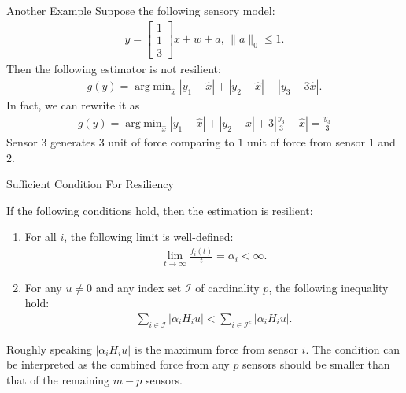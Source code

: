 \documentclass[10pt]{beamer}
\DeclareMathOperator{\argmin}{arg\;min}
\begin{document}
\begin{frame}{Another Example}
  Suppose the following sensory model:
  \begin{align*}
    y = \begin{bmatrix}
      1\\
      1\\
      3
    \end{bmatrix}x + w+a ,\,\|a\|_0\leq 1.
  \end{align*}
  Then the following estimator is not resilient:
  \begin{align*}
    g(y) = \argmin_{\hat x}  |y_1-\hat x|+|y_2-\hat x|+|y_3-3\hat x|.
  \end{align*}
  In fact, we can rewrite it as
  \begin{align*}
    g(y) = \argmin_{\hat x}  |y_1-\hat x|+|y_2-\hat x|+3\left|\frac{y_3}{3}-\hat x\right| = \frac{y_3}{3}
  \end{align*}
  Sensor $3$ generates $3$ unit of force comparing to $1$ unit of force from sensor $1$ and $2$.
\end{frame}

\begin{frame}{Sufficient Condition For Resiliency}
  \begin{theorem}
    If the following conditions hold, then the estimation is resilient:
    \begin{enumerate}
    \item For all $i$, the following limit is well-defined:
      \begin{align*}
        \lim_{t\rightarrow\infty}\frac{f_i(t)}{t} = \alpha_i < \infty.
      \end{align*}
    \item For any $u\neq 0$ and any index set $\mathcal I$ of cardinality $p$, the following inequality hold:
      \begin{align*}
        \sum_{i\in \mathcal I} |\alpha_i H_i u| < \sum_{i\in \mathcal I^c} |\alpha_i H_i u|.
      \end{align*}
    \end{enumerate}
  \end{theorem}
  Roughly speaking $|\alpha_i H_i u|$ is the maximum force from sensor $i$. The condition can be interpreted as the combined force from any $p$ sensors should be smaller than that of the remaining $m-p$ sensors.
\end{frame}
\end{document}
